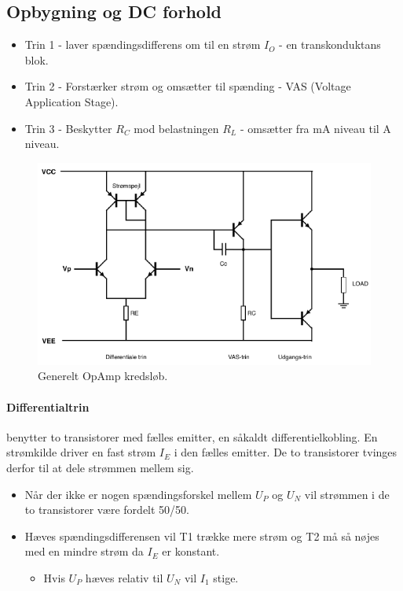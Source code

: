 \documentclass[danish]{article}
\begin{document}
\subsection{Opbygning og DC forhold}
\begin{itemize}
	\item Trin 1 - laver spændingsdifferens om til en strøm $I_O$ - en transkonduktans blok.
	\item Trin 2 - Forstærker strøm og omsætter til spænding - VAS (Voltage Application Stage).
	\item Trin 3 - Beskytter $R_C$ mod belastningen $R_L$ - omsætter fra mA niveau til A niveau.
\end{itemize}

\begin{figure} [H]
	\centering
	\includegraphics[width=0.85\linewidth]{graphics/opamp}
	\caption{Generelt OpAmp kredsløb.}
	\label{fig:opamp}
\end{figure}
\newpage 
\paragraph{Differentialtrin} benytter to transistorer med fælles emitter, en såkaldt differentielkobling. En strømkilde driver en fast strøm $I_E$ i den fælles emitter. De to transistorer tvinges derfor til at dele strømmen mellem sig. 

\begin{itemize}
	\item Når der ikke er nogen spændingsforskel mellem $U_P$ og $U_N$ vil strømmen i de to transistorer være fordelt 50/50.
	\item Hæves spændingsdifferensen vil T1 trække mere strøm og T2 må så nøjes med en mindre strøm da $I_E$ er konstant. 
	\begin{itemize}
		\item Hvis $U_P$ hæves relativ til $U_N$ vil $I_1$ stige.
	\end{itemize}
\end{itemize} 
\end{document}
